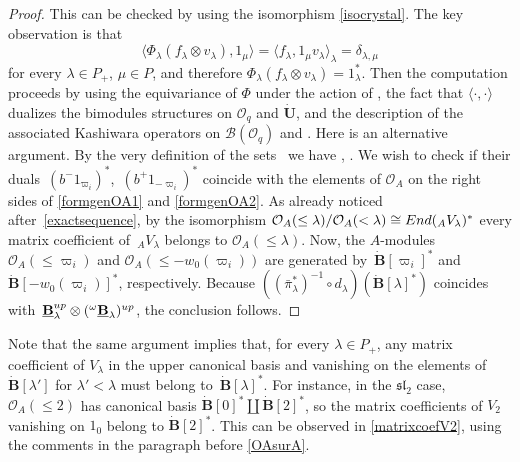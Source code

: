 \documentclass[11pt]{article}
\numberwithin{equation}{section}
\numberwithin{equation}{section}
\theoremstyle{definition}
\newcommand{\Oq}{\Oo_{q}}
\newcommand{\Oo}{{\mathcal O}}
\begin{document}
\begin{proof} This can be checked by using the isomorphism \eqref{isocrystal}. The key observation is that
 \[\langle \Phi_\lambda(f_\lambda \otimes v_\lambda), 1_\mu\rangle = \langle f_\lambda , 1_\mu v_\lambda \rangle_\lambda = \delta_{\lambda,\mu}\]
 for every $\lambda\in P_+$, $\mu\in P$, and therefore $\Phi_\lambda(f_\lambda \otimes v_\lambda) = 1_\lambda^*$. Then the computation proceeds by using the equivariance of $\Phi$ under the action of , the fact that $\langle\cdot,\cdot \rangle$ dualizes the bimodules structures on $\Oq$ and $\dot{\mathbf{U}}$, and the description of the associated Kashiwara operators on $\mathcal{B}(\Oo_q)$ and . Here is an alternative argument. By the very definition of the sets~ we have , . We wish to check if their duals~$(b^-1_{\varpi_i})^*$,~$(b^+1_{-\varpi_i})^*$ coincide with the elements of $\Oo_A$ on the right sides of \eqref{formgenOA1} and \eqref{formgenOA2}. As already noticed after~\eqref{exactsequence}, by the isomorphism $\Oo_A(\leq \lambda)/\Oo_A(<\lambda) \cong {\rm End}({}_AV_\lambda)^*$ every matrix coefficient of~${}_AV_\lambda$ belongs to $\Oo_A(\leq \lambda)$. Now, the $A$-modules $\Oo_A(\leq \varpi_i)$ and $\Oo_A(\leq -w_0(\varpi_i))$ are generated by~${\dot{\mathbf{B}}[\varpi_i]^*}$ and $\dot{\mathbf{B}} [-w_0(\varpi_i)]^*$, respectively. Because $((\bar{\pi}_{\lambda}^*)^{-1} \circ d_{\lambda})(\dot{\mathbf{B}} [\lambda]^*)$ coincides with~${\underline{\mathbf{B}}_{\lambda}^{\rm up} \otimes ({}^{\omega}\underline{\mathbf{B}}_{\lambda})^{\rm up}}$, the conclusion follows.
 \end{proof}

Note that the same argument implies that, for every $\lambda\in P_+$, any matrix coefficient of $V_\lambda$ in the upper canonical basis and vanishing on the elements of $\dot{\mathbf{B}} [\lambda']$ for $\lambda'<\lambda$ must belong to~$\dot{\mathbf{B}} [\lambda]^*$. For instance, in the ${\mathfrak{sl}_2}$ case, $\Oo_A(\leq 2)$ has canonical basis $\dot{\mathbf{B}} [0]^* \coprod \dot{\mathbf{B}} [2]^*$, so the matrix coefficients of $V_2$ vanishing on $1_0$ belong to $\dot{\mathbf{B}} [2]^*$. This can be observed in \eqref{matrixcoefV2}, using the comments in the paragraph before \eqref{OAsurA}.
\end{document}
